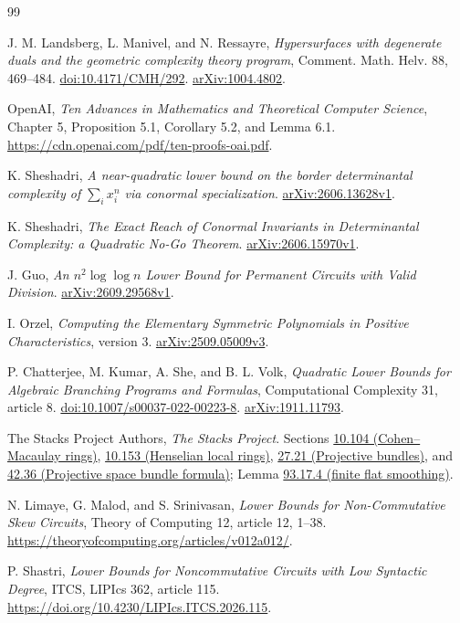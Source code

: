 \documentclass[11pt]{article}
\theoremstyle{remark}\newtheorem{remark}[theorem]{Remark}
\begin{document}
\begin{thebibliography}{99}\raggedright
{}
J. M. Landsberg, L. Manivel, and N. Ressayre,
\emph{Hypersurfaces with degenerate duals and the geometric complexity
theory program}, Comment. Math. Helv. 88, 469--484.
\href{https://doi.org/10.4171/CMH/292}{doi:10.4171/CMH/292}.
\href{https://arxiv.org/abs/1004.4802}{arXiv:1004.4802}.

OpenAI, \emph{Ten Advances in Mathematics and Theoretical Computer
Science}, Chapter 5, Proposition 5.1,
Corollary 5.2, and Lemma 6.1.
\url{https://cdn.openai.com/pdf/ten-proofs-oai.pdf}.

K. Sheshadri, \emph{A near-quadratic lower bound on the border
determinantal complexity of $\sum_i x_i^n$ via conormal specialization}.
\href{https://arxiv.org/abs/2606.13628}{arXiv:2606.13628v1}.

K. Sheshadri, \emph{The Exact Reach of Conormal Invariants in
Determinantal Complexity: a Quadratic No-Go Theorem}.
\href{https://arxiv.org/abs/2606.15970v1}{arXiv:2606.15970v1}.

J. Guo, \emph{An $n^2\log\log n$ Lower Bound for Permanent Circuits
with Valid Division}.
\href{https://arxiv.org/abs/2609.29568v1}{arXiv:2609.29568v1}.

I. Orzel, \emph{Computing the Elementary Symmetric Polynomials in
Positive Characteristics}, version 3.
\href{https://arxiv.org/abs/2509.05009v3}{arXiv:2509.05009v3}.

P. Chatterjee, M. Kumar, A. She, and B. L. Volk,
\emph{Quadratic Lower Bounds for Algebraic Branching Programs and
Formulas}, Computational Complexity 31, article 8.
\href{https://doi.org/10.1007/s00037-022-00223-8}{doi:10.1007/s00037-022-00223-8}.
\href{https://arxiv.org/abs/1911.11793}{arXiv:1911.11793}.

The Stacks Project Authors, \emph{The Stacks Project}.
Sections \href{https://stacks.math.columbia.edu/tag/00N7}{10.104 (Cohen--Macaulay rings)},
\href{https://stacks.math.columbia.edu/tag/04GE}{10.153 (Henselian local rings)},
\href{https://stacks.math.columbia.edu/tag/01OA}{27.21 (Projective bundles)}, and
\href{https://stacks.math.columbia.edu/tag/02TV}{42.36 (Projective space bundle formula)};
Lemma \href{https://stacks.math.columbia.edu/tag/0E7W}{93.17.4 (finite flat smoothing)}.

N. Limaye, G. Malod, and S. Srinivasan,
\emph{Lower Bounds for Non-Commutative Skew Circuits},
Theory of Computing 12, article 12, 1--38.
\url{https://theoryofcomputing.org/articles/v012a012/}.

P. Shastri, \emph{Lower Bounds for Noncommutative Circuits with Low
Syntactic Degree}, ITCS, LIPIcs 362, article 115.
\url{https://doi.org/10.4230/LIPIcs.ITCS.2026.115}.
\end{thebibliography}
\end{document}
